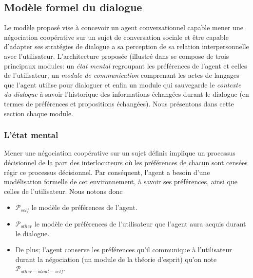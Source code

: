 \documentclass [french]{sig-alternate-05-2015}
\begin{document}
\subsection{Modèle formel du dialogue}
\par Le modèle proposé vise à concevoir un agent conversationnel capable mener une négociation coopérative sur un sujet de conversation sociale et être capable d'adapter ses stratégies de dialogue a sa perception de sa relation interpersonnelle avec l'utilisateur. L'architecture proposée (illustré dans
 se compose de trois principaux modules: un \textit{état mental} regroupant les préférences de l'agent et celles de l'utilisateur, un \textit{module de communication} comprenant les actes de langages que l'agent utilise pour dialoguer et enfin un module qui sauvegarde le \textit{contexte du dialogue} à savoir l'historique des informations échangées durant le dialogue (en termes de préférences et propositions échangées). Nous présentons dans cette section chaque module.


\subsubsection{L'état mental}
\par Mener une négociation coopérative sur un sujet définis implique un processus décisionnel de la part des interlocuteurs  où les préférences de chacun sont censées régir ce processus décisionnel. Par conséquent, l'agent a besoin d'une modélisation formelle de cet environnement, à savoir ses préférences, ainsi que celles de l'utilisateur. Nous notons donc
 \begin{itemize}
 	\item  $\mathcal{P}_{self}$ le modèle de préférences de l'agent.
 	\item $\mathcal{P}_{other}$ le modèle de préférences de l'utilisateur que l'agent aura acquis durant le dialogue.
 	\item De plus; l'agent conserve les préférences qu'il communique à l'utilisateur durant la négociation (un module de la théorie d'esprit) qu'on note $\mathcal{P}_{other-about-self}$.
 \end{itemize}

\end{document}
